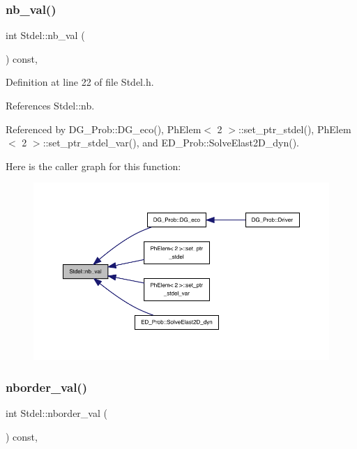 \subsubsection{\texorpdfstring{nb\+\_\+val()}{nb\_val()}}
{\footnotesize\ttfamily int Stdel\+::nb\+\_\+val (\begin{DoxyParamCaption}{ }\end{DoxyParamCaption}) const\hspace{0.3cm}{\ttfamily [inline]}, {\ttfamily [inherited]}}



Definition at line 22 of file Stdel.\+h.



References Stdel\+::nb.



Referenced by D\+G\+\_\+\+Prob\+::\+D\+G\+\_\+eco(), Ph\+Elem$<$ 2 $>$\+::set\+\_\+ptr\+\_\+stdel(), Ph\+Elem$<$ 2 $>$\+::set\+\_\+ptr\+\_\+stdel\+\_\+var(), and E\+D\+\_\+\+Prob\+::\+Solve\+Elast2\+D\+\_\+dyn().

Here is the caller graph for this function\+:
\nopagebreak
\begin{figure}[H]
\begin{center}
\leavevmode
\includegraphics[width=350pt]{classStdel_a4fb0a049dc27d8e67665a56d1b5a18ba_icgraph}
\end{center}
\end{figure}
\mbox{\label{classStdel_aac8e97661e46c48fafa91f13caa03a9f}} 
\subsubsection{\texorpdfstring{nborder\+\_\+val()}{nborder\_val()}}
{\footnotesize\ttfamily int Stdel\+::nborder\+\_\+val (\begin{DoxyParamCaption}{ }\end{DoxyParamCaption}) const\hspace{0.3cm}{\ttfamily [inline]}, {\ttfamily [inherited]}}



